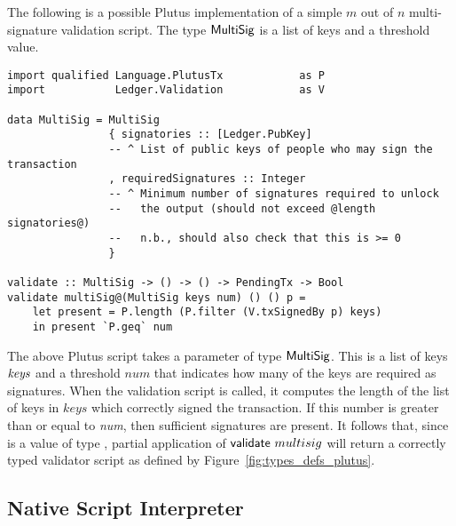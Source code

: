 \documentclass[11pt,a4paper,dvipsnames,twosided]{article}
\theoremstyle{definition}
\begin{document}
The following is a possible Plutus implementation of a simple $m$ out of $n$
multi-signature validation script. The type $\mathsf{MultiSig}$ is a list of keys
and a threshold value.

\begin{verbatim}
import qualified Language.PlutusTx            as P
import           Ledger.Validation            as V

data MultiSig = MultiSig
                { signatories :: [Ledger.PubKey]
                -- ^ List of public keys of people who may sign the transaction
                , requiredSignatures :: Integer
                -- ^ Minimum number of signatures required to unlock
                --   the output (should not exceed @length signatories@)
                --   n.b., should also check that this is >= 0
                }

validate :: MultiSig -> () -> () -> PendingTx -> Bool
validate multiSig@(MultiSig keys num) () () p =
    let present = P.length (P.filter (V.txSignedBy p) keys)
    in present `P.geq` num
\end{verbatim}

The above Plutus script takes a parameter  of type
$\mathsf{MultiSig}$.  This is a list of keys $\mathit{keys}$ and a threshold $num$
that indicates how many of the keys are required as signatures. When the
validation script is called, it computes the length of the list of keys in $keys$ which correctly signed
the transaction. If this number is greater than or equal to \emph{num},
then sufficient signatures are present. It follows that, since
 is a value of type , partial application of
$\mathsf{validate}~multisig$ will return a correctly typed validator script
as defined by Figure~\ref{fig:types_defs_plutus}.

\subsection{Native Script Interpreter}
\label{sec:native-script-interp}
\end{document}

